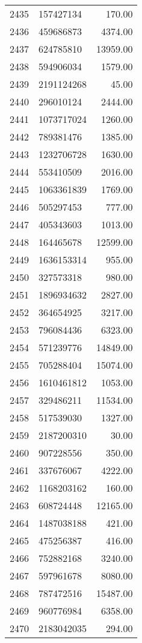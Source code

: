 \begin{table}[ht]
\begin{tabular}{rlr}
  2435 & 157427134 & 170.00 \\ 
  2436 & 459686873 & 4374.00 \\ 
  2437 & 624785810 & 13959.00 \\ 
  2438 & 594906034 & 1579.00 \\ 
  2439 & 2191124268 & 45.00 \\ 
  2440 & 296010124 & 2444.00 \\ 
  2441 & 1073717024 & 1260.00 \\ 
  2442 & 789381476 & 1385.00 \\ 
  2443 & 1232706728 & 1630.00 \\ 
  2444 & 553410509 & 2016.00 \\ 
  2445 & 1063361839 & 1769.00 \\ 
  2446 & 505297453 & 777.00 \\ 
  2447 & 405343603 & 1013.00 \\ 
  2448 & 164465678 & 12599.00 \\ 
  2449 & 1636153314 & 955.00 \\ 
  2450 & 327573318 & 980.00 \\ 
  2451 & 1896934632 & 2827.00 \\ 
  2452 & 364654925 & 3217.00 \\ 
  2453 & 796084436 & 6323.00 \\ 
  2454 & 571239776 & 14849.00 \\ 
  2455 & 705288404 & 15074.00 \\ 
  2456 & 1610461812 & 1053.00 \\ 
  2457 & 329486211 & 11534.00 \\ 
  2458 & 517539030 & 1327.00 \\ 
  2459 & 2187200310 & 30.00 \\ 
  2460 & 907228556 & 350.00 \\ 
  2461 & 337676067 & 4222.00 \\ 
  2462 & 1168203162 & 160.00 \\ 
  2463 & 608724448 & 12165.00 \\ 
  2464 & 1487038188 & 421.00 \\ 
  2465 & 475256387 & 416.00 \\ 
  2466 & 752882168 & 3240.00 \\ 
  2467 & 597961678 & 8080.00 \\ 
  2468 & 787472516 & 15487.00 \\ 
  2469 & 960776984 & 6358.00 \\ 
  2470 & 2183042035 & 294.00 \\ 

\end{tabular}
\end{table}
